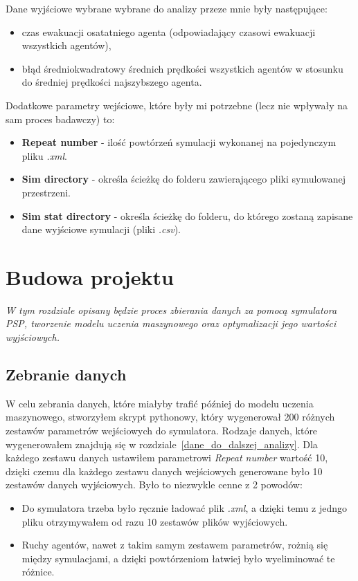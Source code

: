 \documentclass[12pt]{aghdpl}
\begin{document}
		Dane wyjściowe wybrane wybrane do analizy przeze mnie były następujące:
		
		\begin{itemize}
		\item czas ewakuacji osatatniego agenta (odpowiadający czasowi ewakuacji wszystkich agentów),
		\item błąd średniokwadratowy średnich prędkości wszystkich agentów w stosunku do średniej prędkości najszybszego agenta.
		\end{itemize}
		
		Dodatkowe parametry wejściowe, które były mi potrzebne (lecz nie wpływały na sam proces badawczy) to:
		\begin{itemize}
		\item \textbf{Repeat number} - ilość powtórzeń symulacji wykonanej na pojedynczym pliku \textit{.xml}.
		\item \textbf{Sim directory} - określa ścieżkę do folderu zawierającego pliki symulowanej przestrzeni.
		\item \textbf{Sim stat directory} - określa ścieżkę do folderu, do którego zostaną zapisane dane wyjściowe symulacji (pliki \textit{.csv}).
		\end{itemize}
		
	\newpage
	\chapter{Budowa projektu}
	\textit{W tym rozdziale opisany będzie proces zbierania danych za pomocą symulatora PSP, tworzenie modelu uczenia maszynowego oraz optymalizacji jego wartości wyjściowych.}
	
		\section{Zebranie danych}
		W celu zebrania danych, które miałyby trafić później do modelu uczenia maszynowego, stworzyłem skrypt pythonowy, który wygenerował 200 różnych zestawów parametrów wejściowych do symulatora. Rodzaje danych, które wygenerowałem znajdują się w rozdziale~\ref{dane_do_dalszej_analizy}. Dla każdego zestawu danych ustawiłem parametrowi \textit{Repeat number} wartość 10, dzięki czemu dla każdego zestawu danych wejściowych generowane było 10 zestawów danych wyjściowych. Było to niezwykle cenne z 2 powodów:
		\begin{itemize}
		\item Do symulatora trzeba było ręcznie ładować plik \textit{.xml}, a dzięki temu z jedngo pliku otrzymywałem od razu 10 zestawów plików wyjściowych.
		\item Ruchy agentów, nawet z takim samym zestawem parametrów, rożnią się między symulacjami, a dzięki powtórzeniom łatwiej było wyeliminować te różnice.
		\end{itemize}
		
\end{document}
